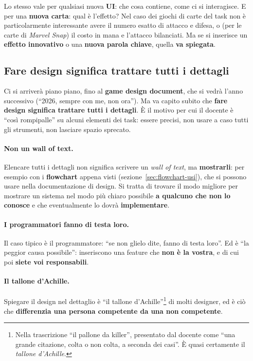 Lo stesso vale per qualsiasi nuova \textbf{UI}: che cosa contiene, come ci si
interagisce. E per una \textbf{nuova carta}: qual è l'effetto? Nel caso dei
giochi di carte del task non è particolarmente interessante avere il numero
esatto di attacco e difesa, o (per le carte di \emph{Marvel Snap}) il costo
in mana e l'attacco bilanciati. Ma se si inserisce un \textbf{effetto
innovativo} o una \textbf{nuova parola chiave}, quella \textbf{va
spiegata}.

\subsection{Fare design significa trattare tutti i dettagli}

Ci si arriverà piano piano, fino al \textbf{game design document}, che si
vedrà l'anno successivo (``2026, sempre con me, non ora''). Ma va capito
subito che \textbf{fare design significa trattare tutti i dettagli}. È il
motivo per cui il docente è ``così rompipalle'' su alcuni elementi dei task:
essere precisi, non usare a caso tutti gli strumenti, non lasciare spazio
sprecato.

\paragraph{Non un wall of text.} Elencare tutti i dettagli non significa
scrivere un \emph{wall of text}, ma \textbf{mostrarli}: per esempio con i
\textbf{flowchart} appena visti (sezione~\ref{sec:flowchart-usi}), che si
possono usare nella documentazione di design. Si tratta di trovare il modo
migliore per mostrare un sistema nel modo più chiaro possibile \textbf{a
qualcuno che non lo conosce} e che eventualmente lo dovrà
\textbf{implementare}.

\paragraph{I programmatori fanno di testa loro.} Il caso tipico è il
programmatore: ``se non glielo dite, fanno di testa loro''. Ed è ``la
peggior causa possibile'': inseriscono una feature che \textbf{non è la
vostra}, e di cui poi \textbf{siete voi responsabili}.

\paragraph{Il tallone d'Achille.} Spiegare il design nel dettaglio è
``il tallone d'Achille''\footnote{Nella trascrizione ``il pallone da
killer'', presentato dal docente come ``una grande citazione, colta o non
colta, a seconda dei casi''. È quasi certamente il \emph{tallone d'Achille}.}
di molti designer, ed è ciò che \textbf{differenzia una persona competente
da una non competente}.

